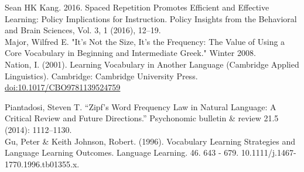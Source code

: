\documentclass[11pt]{article}
\begin{document}
Sean HK Kang. 2016. Spaced Repetition Promotes Efficient and Effective Learning: Policy Implications for Instruction. Policy Insights from the Behavioral and Brain Sciences, Vol. 3, 1 (2016), 12--19. \\

Major, Wilfred E. "It’s Not the Size, It’s the Frequency: The Value of Using a Core Vocabulary in Beginning and Intermediate Greek." Winter 2008. \\

Nation, I. (2001). Learning Vocabulary in Another Language (Cambridge Applied Linguistics). Cambridge: Cambridge University Press. \url{doi:10.1017/CBO9781139524759}

Piantadosi, Steven T. “Zipf’s Word Frequency Law in Natural Language: A Critical Review and Future Directions.” Psychonomic bulletin \& review 21.5 (2014): 1112–1130. \\

Gu, Peter \& Keith Johnson, Robert. (1996). Vocabulary Learning Strategies and Language Learning Outcomes. Language Learning. 46. 643 - 679. 10.1111/j.1467-1770.1996.tb01355.x. \\
\end{document}
